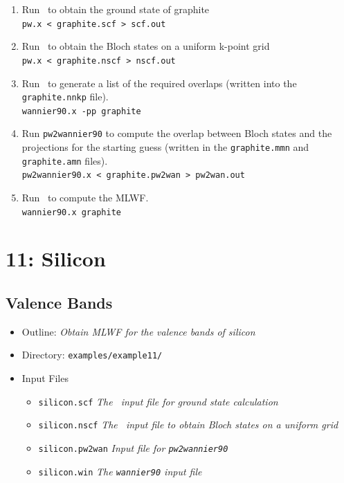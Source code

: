 \documentclass[a4paper,11pt,twoside]{article}
\begin{document}
\begin{enumerate}
\item Run \pwscf\ to obtain the ground state of graphite\\
{\tt pw.x < graphite.scf > scf.out}

\item Run \pwscf\ to obtain the Bloch states on a uniform k-point grid\\
{\tt pw.x < graphite.nscf > nscf.out}

\item Run \wannier\ to generate a list of the required overlaps (written
  into the {\tt graphite.nnkp} file).\\ 
{\tt wannier90.x -pp graphite}

\item Run {\tt pw2wannier90} to compute the overlap between Bloch
  states and the projections for the starting guess (written in the
  {\tt graphite.mmn} and {\tt graphite.amn} files).\\  
{\tt pw2wannier90.x < graphite.pw2wan > pw2wan.out}

\item Run \wannier\ to compute the MLWF.\\
{\tt wannier90.x graphite}
\end{enumerate}


\cleardoublepage


\section*{11: Silicon}
\subsection*{Valence Bands}
\begin{itemize}
\item{Outline: \it{Obtain MLWF for the valence bands of silicon}}
\item{Directory: {\tt examples/example11/}}
\item{Input Files}
\begin{itemize}
\item{ {\tt silicon.scf}  {\it The \pwscf\ input file for ground state
    calculation}} 
\item{ {\tt silicon.nscf}  {\it The \pwscf\ input file to obtain Bloch
    states on a uniform grid}} 
\item{ {\tt silicon.pw2wan}  {\it Input file for {\tt pw2wannier90}}}
\item{ {\tt silicon.win}  {\it The {\tt wannier90} input file}}
\end{itemize}

\end{itemize}
\end{document}
